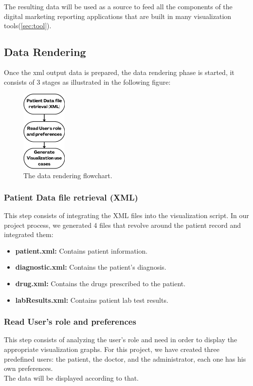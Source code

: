 \bigbreak
The resulting data will be used as a source to feed all the components of the digital marketing reporting applications that are built in many visualization tools(\ref{sec:tool}).

\subsection{Data Rendering}

Once the xml output data is prepared, the data rendering phase is started, it consists of 3 stages as illustrated in the following figure:

\begin{figure}[h!]
  \center
  \includegraphics[width=0.20\textwidth]{images/chapter3/rendering.png}
  \caption{The data rendering flowchart.}
  \label{fig:rendering}
\end{figure}

\subsubsection*{Patient Data file retrieval (XML)}
This step consists of integrating the XML files into the visualization script. In our project process, we generated 4 files that revolve around the patient record and integrated them:
\begin{itemize}
  \renewcommand{\labelitemi}{$\bullet$}
  \item \textbf{patient.xml: }Contains patient information.
  \item \textbf{diagnostic.xml: }Contains the patient's diagnosis.
  \item \textbf{drug.xml: }Contains the drugs prescribed to the patient.
  \item \textbf{labResults.xml: }Contains patient lab test results.
\end{itemize}

\subsubsection*{Read User's role and preferences}
This step consists of analyzing the user's role and need in order to display the appropriate visualization graphs. For this project, we have created three predefined users: the patient, the doctor, and the administrator, each one has his own preferences.\\
The data will be displayed according to that.
\newpage
